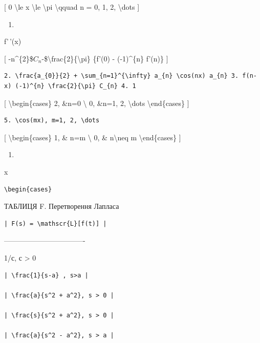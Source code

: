 \documentclass[
]{article}
\providecommand{\tightlist}{%
  \setlength{\itemsep}{0pt}\setlength{\parskip}{0pt}}
\begin{document}
{{{{{[} 0 \textbackslash le x \textbackslash le \textbackslash pi
\textbackslash qquad n = 0, 1, 2, \textbackslash dots {]}

\begin{enumerate}
\def\labelenumi{\arabic{enumi}.}
\tightlist
\item
\end{enumerate}

f'\,'(x)

{[}
-n\^{}\{2\}\$\(C_{n}\)-\$\textbackslash frac\{2\}\{\textbackslash pi\}
\{f'(0) - (-1)\^{}\{n\} f'(n)\} {]}

\begin{verbatim}
2. \frac{a_{0}}{2} + \sum_{n=1}^{\infty} a_{n} \cos(nx) a_{n} 3. f(n-x) (-1)^{n} \frac{2}{\pi} C_{n} 4. 1
\end{verbatim}

{[} \textbackslash begin\{cases\} 2, \&n=0 \textbackslash{} 0, \&n=1, 2,
\textbackslash dots \textbackslash end\{cases\} {]}

\begin{verbatim}
5. \cos(mx), m=1, 2, \dots
\end{verbatim}

{[} \textbackslash begin\{cases\} 1, \& n=m \textbackslash{} 0, \&
n\textbackslash neq m \textbackslash end\{cases\} {]}

\begin{enumerate}
\def\labelenumi{\arabic{enumi}.}
\setcounter{enumi}{5}
\tightlist
\item
\end{enumerate}

x

\begin{verbatim}
\begin{cases}
\end{verbatim}

ТАБЛИЦЯ F. Перетворення Лапласа

\begin{verbatim}
| F(s) = \mathscr{L}[f(t)] |
\end{verbatim}

\textbar----------------------------------\textbar{}

1/с, с \textgreater{} 0 \textbar{}

\begin{verbatim}
| \frac{1}{s-a} , s>a |

| \frac{a}{s^2 + a^2}, s > 0 |

| \frac{s}{s^2 + a^2}, s > 0 |

| \frac{a}{s^2 - a^2}, s > a |


\end{verbatim}}}}}
\end{document}
